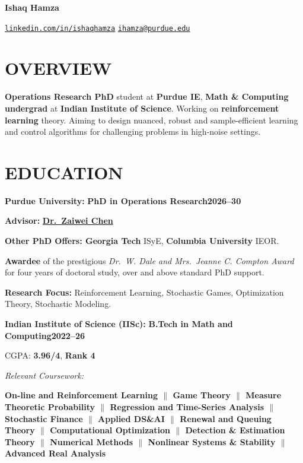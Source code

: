 \documentclass[10pt,letterpaper]{article}
\begin{document}
\begin{center}
  {\fontsize{24.88}{28}\selectfont\bfseries Ishaq Hamza}\par\vspace{5pt}
  \href{https://www.linkedin.com/in/ishaqhamza}{\texttt{linkedin.com/in/ishaqhamza}}\qquad
  \href{mailto:ihamza@purdue.edu}{\texttt{ihamza@purdue.edu}}
\end{center}

\section*{OVERVIEW}
\textbf{Operations Research PhD} student at \textbf{Purdue IE}, \textbf{Math \& Computing undergrad} at
\textbf{Indian Institute of Science}. Working on \textbf{reinforcement learning} theory. Aiming to design
nuanced, robust and sample-efficient learning and control algorithms for challenging problems in
high-noise settings.

\section*{EDUCATION}
{\Large\bfseries Purdue University:} \textbf{PhD in Operations Research}\hfill\textbf{2026--30}\par
\textbf{Advisor:} \href{https://sites.google.com/view/zaiweichen/home}{\textbf{Dr.~Zaiwei Chen}}\par
\vspace{5pt}
\textbf{Other PhD Offers: Georgia Tech} ISyE, \textbf{Columbia University} IEOR.\par
\vspace{4pt}
\textbf{Awardee} of the prestigious \emph{Dr.~W. Dale and Mrs.~Jeanne C. Compton Award} for four years of
doctoral study, over and above standard PhD support.\par
\vspace{4pt}
\textbf{Research Focus:} Reinforcement Learning, Stochastic Games, Optimization Theory, Stochastic Modeling.

\vspace{9pt}
{\Large\bfseries Indian Institute of Science (IISc):} \textbf{B.Tech in Math and Computing}\hfill\textbf{2022--26}\par
CGPA: \textbf{3.96/4}, \textbf{Rank 4}\par
\vspace{6pt}
{\itshape Relevant Coursework:}\par
\textbf{On-line and Reinforcement Learning $\|$ Game Theory $\|$ Measure Theoretic Probability $\|$
Regression and Time-Series Analysis $\|$ Stochastic Finance $\|$ Applied DS\&AI $\|$
Renewal and Queuing Theory $\|$ Computational Optimization $\|$ Detection \& Estimation Theory $\|$
Numerical Methods $\|$ Nonlinear Systems \& Stability $\|$ Advanced Real Analysis}
\end{document}
